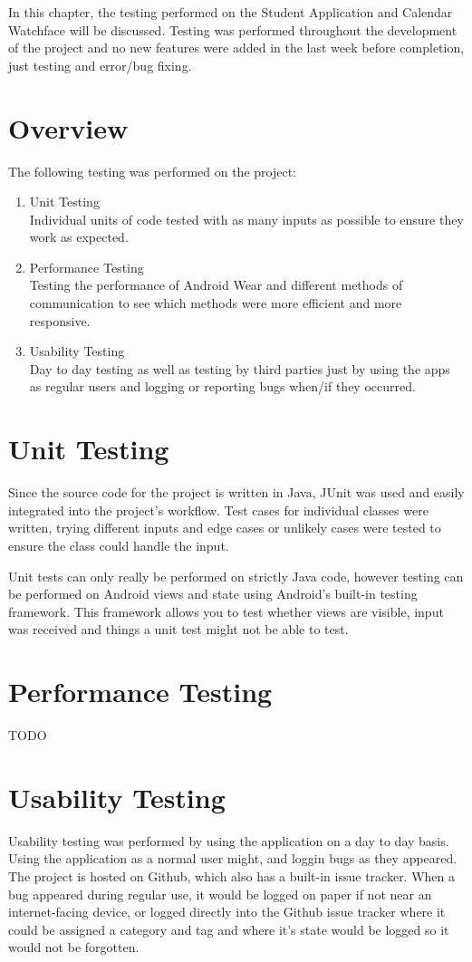 In this chapter, the testing performed on the Student Application and Calendar
Watchface will be discussed. Testing was performed throughout the development
of the project and no new features were added in the last week before
completion, just testing and error/bug fixing.

\section{Overview}

The following testing was performed on the project:
\begin{enumerate}
\item Unit Testing\\
    Individual units of code tested with as many inputs as possible to ensure
    they work as expected.
\item Performance Testing\\
    Testing the performance of Android Wear and different methods of
    communication to see which methods were more efficient and more responsive.
\item Usability Testing\\
    Day to day testing as well as testing by third parties just by using the
    apps as regular users and logging or reporting bugs when/if they occurred.
\end{enumerate}

\section{Unit Testing}

Since the source code for the project is written in Java, JUnit was used and
easily integrated into the project's workflow. Test cases for individual classes
were written, trying different inputs and edge cases or unlikely cases were
tested to ensure the class could handle the input.

Unit tests can only really be performed on strictly Java code, however testing
can be performed on Android views and state using Android's built-in testing
framework. This framework allows you to test whether views are visible, input
was received and things a unit test might not be able to test.

\section{Performance Testing}
TODO

\section{Usability Testing}
Usability testing was performed by using the application on a day to day basis.
Using the application as a normal user might, and loggin bugs as they appeared.
The project is hosted on Github, which also has a built-in issue tracker. When
a bug appeared during regular use, it would be logged on paper if not near an
internet-facing device, or logged directly into the Github issue tracker where
it could be assigned a category and tag and where it's state would be logged so
it would not be forgotten.

